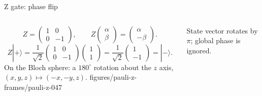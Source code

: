 \begin{frame}{Z gate: phase flip}
  \begin{columns}[c,onlytextwidth]
    \[
      Z=\begin{pmatrix}1&0\\0&-1\end{pmatrix},\qquad
      Z\begin{pmatrix}\alpha\\\beta\end{pmatrix}
       =\begin{pmatrix}\alpha\\-\beta\end{pmatrix}.
    \]
    \[
      Z|+\rangle=\frac{1}{\sqrt2}
      \begin{pmatrix}1&0\\0&-1\end{pmatrix}
      \begin{pmatrix}1\\1\end{pmatrix}
      =\frac{1}{\sqrt2}\begin{pmatrix}1\\-1\end{pmatrix}=|-\rangle.
    \]
    On the Bloch sphere: a $180^\circ$ rotation about the $z$ axis,
    $(x,y,z)\mapsto(-x,-y,z)$.
    \centering
      {figures/pauli-z-frames/pauli-z-}{0}{47}
    \par\vspace{0.35em}
    {\scriptsize State vector rotates by $\pi$; global phase is ignored.}
  \end{columns}
\end{frame}
